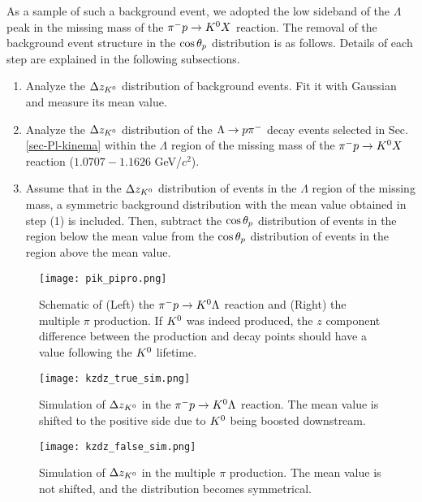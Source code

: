 As a sample of such a background event, we adopted the low sideband of the $\Lambda$ peak in the missing mass of the $\pi^- p \to K^0 X$ reaction. The removal of the background event structure in the $\cos{\theta_p}$ distribution is as follows. Details of each step are explained in the following subsections. 

\begin{enumerate}
  \item Analyze the $\Delta z_{K^{0}}$ distribution of background events. Fit it with Gaussian and measure its mean value.
  \item Analyze the $\Delta z_{K^{0}}$ distribution of the $\Lambda\to p\pi^{-}$ decay events selected in Sec. \ref{sec-Pl-kinema} within the $\Lambda$ region of the missing mass of the $\pi^- p \to K^0 X$ reaction ($1.0707-1.1626$ GeV/$c^{2}$).
  \item Assume that in the $\Delta z_{K^{0}}$ distribution of events in the $\Lambda$ region of the missing mass, a symmetric background distribution with the mean value obtained in step (1) is included. Then, subtract the $\cos{\theta_p}$ distribution of events in the region below the mean value from the $\cos{\theta_p}$ distribution of events in the region above the mean value.
\end{enumerate}

\begin{figure}[h]
  \centering
  \texttt{[image: pik\_pipro.png]}
  \caption{Schematic of (Left) the $\pi^- p \to K^0 \Lambda$ reaction and (Right) the multiple $\pi$ production. If $K^{0}$ was indeed produced, the $z$ component difference between the production and decay points should have a value following the $K^{0}$ lifetime.}
  \label{fig-pik_pipro}
\end{figure}
 
\begin{figure}[!h]
  \begin{minipage}[t]{0.48\columnwidth}
    \centering
    \texttt{[image: kzdz\_true\_sim.png]}
    \caption{Simulation of $\Delta z_{K^{0}}$ in the $\pi^- p \to K^0 \Lambda$ reaction. The mean value is shifted to the positive side due to $K^{0}$ being boosted downstream.}
    \label{fig-kzdz_true_sim}
  \end{minipage}
  \hspace{0.04\columnwidth} %
  \begin{minipage}[t]{0.48\columnwidth}
    \centering
    \texttt{[image: kzdz\_false\_sim.png]}
    \caption{Simulation of $\Delta z_{K^{0}}$ in the multiple $\pi$ production. The mean value is not shifted, and the distribution becomes symmetrical.}
    \label{fig-kzdz_false_sim}
  \end{minipage}
\end{figure}



